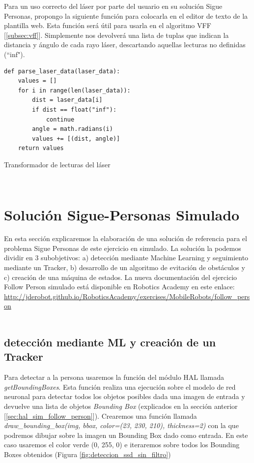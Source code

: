 Para un uso correcto del láser por parte del usuario en su solución Sigue Personas, propongo la siguiente función para colocarla en el editor de texto de la plantilla web. Esta función será útil para usarla en el algoritmo VFF [\ref{subsec:vff}]. Simplemente nos devolverá una lista de tuplas que indican la distancia y ángulo de cada rayo láser, descartando aquellas lecturas no definidas (``inf").\\

\begin{code}[H]
\begin{lstlisting}
def parse_laser_data(laser_data):
    values = []
    for i in range(len(laser_data)):
        dist = laser_data[i]
        if dist == float("inf"):
            continue
        angle = math.radians(i)
        values += [(dist, angle)]
    return values
\end{lstlisting}
\caption[Transformador de lecturas del láser]{Transformador de lecturas del láser}
\label{cod:parse_laser_data}
\end{code}\




\section{Solución Sigue-Personas Simulado}
\label{sec:sigue_personas_simulado}

En esta sección explicaremos la elaboración de una solución de referencia para el problema Sigue Personas de este ejercicio en simulado. La solución la podemos dividir en 3 subobjetivos: a) detección mediante Machine Learning y seguimiento mediante un Tracker, b) desarrollo de un algoritmo de evitación de obstáculos y c) creación de una máquina de estados. La nueva documentación del ejercicio Follow Person simulado está disponible en Robotics Academy en este enlace: \url{http://jderobot.github.io/RoboticsAcademy/exercises/MobileRobots/follow_person}\\\\




\subsection{detección mediante ML y creación de un Tracker}
\label{subsec:ml_tracker}
Para detectar a la persona usaremos la función del módulo HAL llamada \textit{getBoundingBoxes}. Esta función realiza una ejecución sobre el modelo de red neuronal para detectar todos los objetos posibles dada una imagen de entrada y devuelve una lista de objetos \textit{Bounding Box} (explicados en la sección anterior [\ref{sec:hal_sim_follow_person}]). Crearemos una función llamada \textit{draw\_bounding\_box(img, bbox, color=(23, 230, 210), thickness=2)} con la que podremos dibujar sobre la imagen un Bounding Box dado como entrada. En este caso usaremos el color verde (0, 255, 0) e iteraremos sobre todos los Bounding Boxes obtenidos (Figura \ref{fig:deteccion_ssd_sin_filtro})\\

